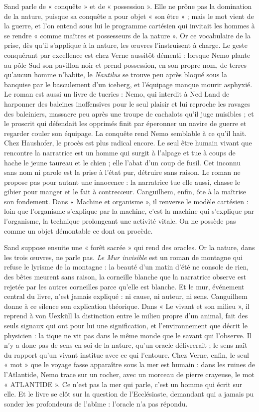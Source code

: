 \documentclass[11pt,a4paper]{article}
\begin{document}
Sand parle de « conquête » et de « possession ». Elle ne prône pas la domination de la nature, puisque sa conquête a pour objet « son être » ; mais le mot vient de la guerre, et l'on entend sous lui le programme cartésien qui invitait les hommes à se rendre « comme maîtres et possesseurs de la nature ». Or ce vocabulaire de la prise, dès qu'il s'applique à la nature, les œuvres l'instruisent à charge. Le geste conquérant par excellence est chez Verne aussitôt démenti : lorsque Nemo plante au pôle Sud son pavillon noir et prend possession, en son propre nom, de terres qu'aucun homme n'habite, le \emph{Nautilus} se trouve peu après bloqué sous la banquise par le basculement d'un iceberg, et l'équipage manque mourir asphyxié. Le roman est aussi un livre de tueries : Nemo, qui interdit à Ned Land de harponner des baleines inoffensives pour le seul plaisir et lui reproche les ravages des baleiniers, massacre peu après une troupe de cachalots qu'il juge nuisibles ; et le proscrit qui défendait les opprimés finit par éperonner un navire de guerre et regarder couler son équipage. La conquête rend Nemo semblable à ce qu'il hait. Chez Haushofer, le procès est plus radical encore. Le seul être humain vivant que rencontre la narratrice est un homme qui surgit à l'alpage et tue à coups de hache le jeune taureau et le chien ; elle l'abat d'un coup de fusil. Cet inconnu sans nom ni parole est la prise à l'état pur, détruire sans raison. Le roman ne propose pas pour autant une innocence : la narratrice tue elle aussi, chasse le gibier pour manger et le fait à contrecœur. Canguilhem, enfin, ôte à la maîtrise son fondement. Dans « Machine et organisme », il renverse le modèle cartésien : loin que l'organisme s'explique par la machine, c'est la machine qui s'explique par l'organisme, la technique prolongeant une activité vitale. On ne possède pas comme un objet démontable ce dont on procède.

Sand suppose ensuite une « forêt sacrée » qui rend des oracles. Or la nature, dans les trois œuvres, ne parle pas. \emph{Le Mur invisible} est un roman de montagne qui refuse le lyrisme de la montagne : la beauté d'un matin d'été ne console de rien, des bêtes meurent sans raison, la corneille blanche que la narratrice observe est rejetée par les autres corneilles parce qu'elle est blanche. Et le mur, événement central du livre, n'est jamais expliqué : ni cause, ni auteur, ni sens. Canguilhem donne à ce silence son explication théorique. Dans « Le vivant et son milieu », il reprend à von Uexküll la distinction entre le milieu propre d'un animal, fait des seuls signaux qui ont pour lui une signification, et l'environnement que décrit le physicien : la tique ne vit pas dans le même monde que le savant qui l'observe. Il n'y a donc pas de sens en soi de la nature, qu'un oracle délivrerait ; le sens naît du rapport qu'un vivant institue avec ce qui l'entoure. Chez Verne, enfin, le seul « mot » que le voyage fasse apparaître sous la mer est humain : dans les ruines de l'Atlantide, Nemo trace sur un rocher, avec un morceau de pierre crayeuse, le mot « ATLANTIDE ». Ce n'est pas la mer qui parle, c'est un homme qui écrit sur elle. Et le livre se clôt sur la question de l'Ecclésiaste, demandant qui a jamais pu sonder les profondeurs de l'abîme : l'oracle n'a pas répondu.
\end{document}
